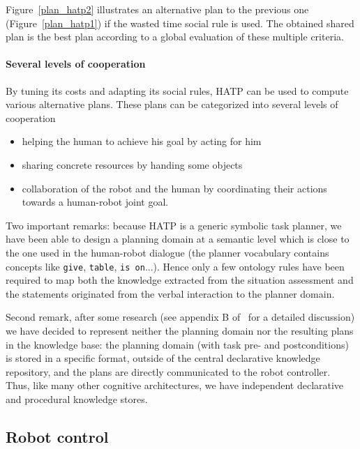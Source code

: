 \documentclass[preprint,5p]{elsarticle}
\begin{document}
Figure~\ref{plan_hatp2} illustrates an alternative plan to the previous 
one (Figure~\ref{plan_hatp1}) if the wasted time social rule is used.
The obtained shared plan is the best plan according to a global evaluation of
these multiple criteria.


\paragraph{Several levels of cooperation} 
By tuning its costs
and adapting its social rules, HATP can be used to compute various
alternative plans. These plans can be categorized into several levels
of cooperation

\begin{itemize}
\item helping the human to achieve his goal by acting for him
\item sharing concrete resources by handing some objects
\item collaboration of the robot and the human by coordinating their
  actions towards a human-robot joint goal.
\end{itemize}



Two important remarks: because HATP is a generic symbolic task planner, we have
been able to design a planning domain at a semantic level which is close to the
one used in the human-robot dialogue (the planner vocabulary contains concepts
like \texttt{give}, \texttt{table}, \texttt{is on}...). Hence only a few
ontology rules have been required to map both the knowledge extracted from the
situation assessment and the statements originated from the verbal interaction
to the planner domain.

Second remark, after some research (see appendix B of~\cite{Lemaignan2012a} for
a detailed discussion)  we have decided to represent neither the planning
domain nor the resulting plans in the knowledge base: the planning domain (with
task pre- and postconditions) is stored in a specific format, outside of the
central declarative knowledge repository, and the plans are directly
communicated to the robot controller. Thus, like many other cognitive
architectures, we have independent declarative and procedural knowledge stores.


\subsection{Robot control}
\label{sect|ctrl}
\end{document}
